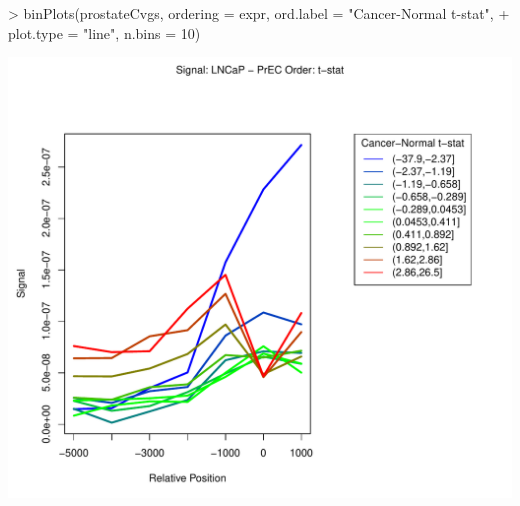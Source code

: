 \begin{Schunk}
\begin{Sinput}
> binPlots(prostateCvgs, ordering = expr, ord.label = "Cancer-Normal t-stat", 
+     plot.type = "line", n.bins = 10)
\end{Sinput}
\end{Schunk}
\includegraphics{binPlotsLine-binPlotsLine}
